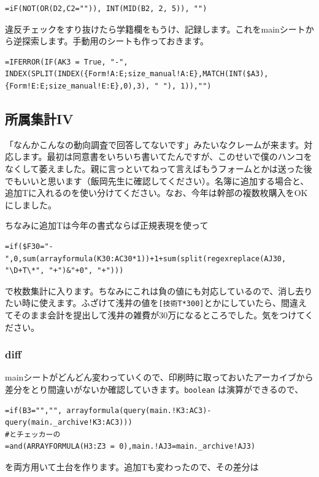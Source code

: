 \documentclass[a4paper]{ltjsreport}
\begin{document}
\begin{lstlisting}
=iF(NOT(OR(D2,C2="")), INT(MID(B2, 2, 5)), "")
\end{lstlisting}

違反チェックをすり抜けたら学籍欄をもうけ、記録します。これをmainシートから逆探索します。手動用のシートも作っておきます。

\begin{lstlisting}
=IFERROR(IF(AK3 = True, "-", INDEX(SPLIT(INDEX({Form!A:E;size_manual!A:E},MATCH(INT($A3),{Form!E:E;size_manual!E:E},0),3), " "), 1)),"")
\end{lstlisting}

\subsection{所属集計IV}
「なんかこんなの動向調査で回答してないです」みたいなクレームが来ます。対応します。最初は同意書をいちいち書いてたんですが、このせいで僕のハンコをなくして萎えました。親に言っといてねって言えばもうフォームとかは送った後でもいいと思います（飯岡先生に確認してください）。名簿に追加する場合と、追加Tに入れるのを使い分けてください。なお、今年は幹部の複数枚購入をOKにしました。

ちなみに追加Tは今年の書式ならば正規表現を使って

\begin{lstlisting}
=if($F30="-",0,sum(arrayformula(K30:AC30*1))+1+sum(split(regexreplace(AJ30, "\D+T\*", "+")&"+0", "+")))
\end{lstlisting}

で枚数集計に入ります。ちなみにこれは負の値にも対応しているので、消し去りたい時に使えます。ふざけて浅井の値を\texttt{[技術T*300]}とかにしていたら、間違えてそのまま会計を提出して浅井の雑費が30万になるところでした。気をつけてください。

\subsubsection{diff}
mainシートがどんどん変わっていくので、印刷時に取っておいたアーカイブから差分をとり間違いがないか確認していきます。\texttt{boolean} は演算ができるので、

\begin{lstlisting}
=if(B3="","", arrayformula(query(main.!K3:AC3)-query(main._archive!K3:AC3)))
#とチェッカーの
=and(ARRAYFORMULA(H3:Z3 = 0),main.!AJ3=main._archive!AJ3)
\end{lstlisting}

を両方用いて土台を作ります。追加Tも変わったので、その差分は
\end{document}
